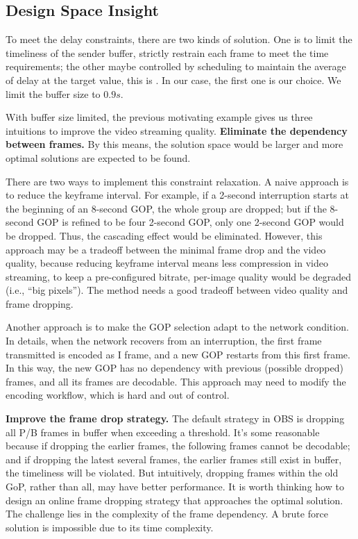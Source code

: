 \subsection{Design Space Insight}
To meet the delay constraints, there are two kinds of solution. One is to limit the timeliness of the sender buffer, strictly restrain each frame to meet the time requirements; the other maybe controlled by scheduling to maintain the average of delay at the target value, this is . In our case, the first one is our choice. We limit the buffer size to $0.9s$.

With buffer size limited, the previous motivating example gives us three intuitions to improve the video streaming quality.
\textbf{Eliminate the dependency between frames.}
By this means, the solution space would be larger and more optimal solutions are expected to be found.

There are two ways to implement this constraint relaxation. A naive approach is to reduce the keyframe interval. For example, if a 2-second interruption starts at the beginning of an 8-second GOP, the whole group are dropped; but if the 8-second GOP is refined to be four 2-second GOP, only one 2-second GOP would be dropped. Thus, the cascading effect would be eliminated. However, this approach may be a tradeoff between the minimal frame drop and the video quality, because reducing keyframe interval means less compression in video streaming, to keep a pre-configured bitrate, per-image quality would be degraded (i.e., ``big pixels''). The method needs a good tradeoff between video quality and frame dropping.

Another approach is to make the GOP selection adapt to the network condition. In details, when the network recovers from an interruption, the first frame transmitted is encoded as I frame, and a new GOP restarts from this first frame. In this way, the new GOP has no dependency with previous (possible dropped) frames, and all its frames are decodable. This approach may need to modify the encoding workflow, which is hard and out of control.

\textbf{Improve the frame drop strategy.} The default strategy in OBS is dropping all P/B frames in buffer when exceeding a threshold. It's some reasonable because if dropping the earlier frames, the following frames cannot be decodable; and if dropping the latest several frames, the earlier frames still exist in buffer, the timeliness will be violated. But intuitively, dropping frames within the old GoP, rather than all, may have better performance. It is worth thinking how to design an online frame dropping strategy that approaches the optimal solution. The challenge lies in the complexity of the frame dependency. A brute force solution is impossible due to its time complexity.

